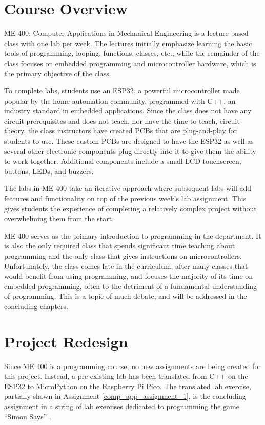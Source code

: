 \section{Course Overview}

ME 400: Computer Applications in Mechanical Engineering is a lecture based class with
one lab per week. The lectures initially emphasize learning the basic tools of
programming, looping, functions, classes, etc., while the remainder of the class
focuses on embedded programming and microcontroller hardware, which is the primary
objective of the class.

To complete labs, students use an ESP32, a powerful microcontroller made popular by
the home automation community, programmed with C++, an industry standard in embedded
applications. Since the class does not have any circuit prerequisites and does not 
teach, nor have the time to teach, circuit theory, the class instructors have created
PCBs that are plug-and-play for students to use. These custom PCBs are designed to have
the ESP32 as well as several other electronic components plug directly into it to
give them the ability to work together. Additional components include a small LCD 
touchscreen, buttons, LEDs, and buzzers. 

The labs in ME 400 take an iterative approach where subsequent labs will add features
and functionality on top of the previous week's lab assignment. This gives students
the experience of completing a relatively complex project without overwhelming them 
from the start. 

ME 400 serves as the primary introduction to programming in the department.
It is also the only required class that spends significant time teaching about programming and the
only class that gives instructions on microcontrollers. Unfortunately, the class comes
late in the curriculum, after many classes that would benefit from using programming,
and focuses the majority of its time on embedded programming, often to the detriment
of a fundamental understanding of programming. This is a topic of much debate, and
will be addressed in the concluding chapters.

\section{Project Redesign}

Since ME 400 is a programming course, no new assignments are being created for this
project. Instead, a pre-existing lab has been translated from C++ on the ESP32 to
MicroPython on the Raspberry Pi Pico. The translated lab exercise, partially shown in 
Assignment \ref{comp_app_assignment_1}, is the concluding
assignment in a string of lab exercises dedicated to programming the game ``Simon Says''
\cite{simon-says}.

